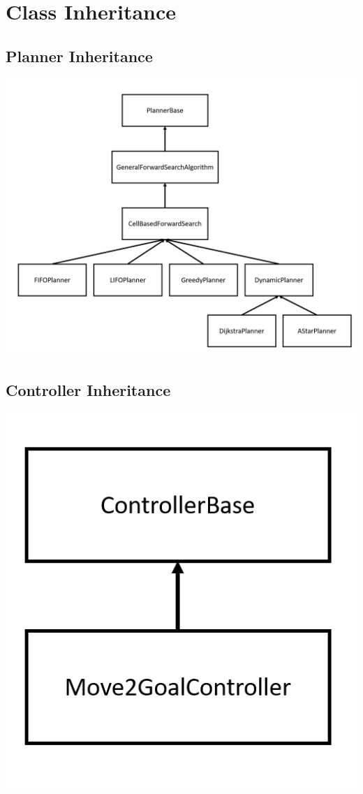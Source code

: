 \documentclass[a4paper,12pt]{article}
\begin{document}
	\newpage
	
	\appendix
	\appendixpage
	\addappheadtotoc
	\section{Class Inheritance}
	\subsection{Planner Inheritance}
	\label{appendix:planner}
	\includegraphics[scale=0.6]{images/planner_inheritance.png}
	\subsection{Controller Inheritance}
	\label{appendix:controller}
	\includegraphics[scale=0.6]{images/controller_inheritance.png}
	
\end{document}
